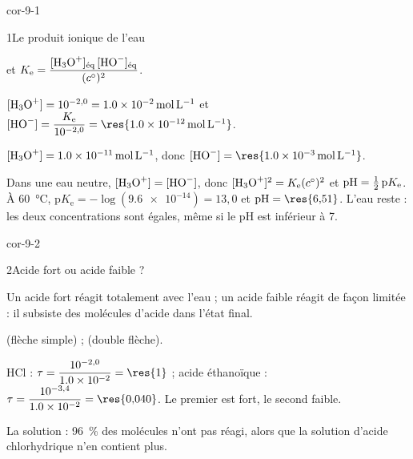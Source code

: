 \corrigesSouples

\begin{blocLivre}{cor-9-1}
\begin{corrige}{1}{Le produit ionique de l'eau}
\begin{questions}
\item {} et $K_\mathrm{e}=\dfrac{[\ce{H3O+}]_\text{éq}\,[\ce{HO-}]_\text{éq}}{(\cst)^2}$.
\item $[\ce{H3O+}]=10^{-2{,}0}=\qty{1,0e-2}{mol.L^{-1}}$ et $[\ce{HO-}]=\dfrac{K_\mathrm{e}}{10^{-2{,}0}}=\res{\qty{1,0e-12}{mol.L^{-1}}}$.
\item $[\ce{H3O+}]=\qty{1,0e-11}{mol.L^{-1}}$, donc $[\ce{HO-}]=\res{\qty{1,0e-3}{mol.L^{-1}}}$.
\item Dans une eau neutre, $[\ce{H3O+}]=[\ce{HO-}]$, donc $[\ce{H3O+}]^2=K_\mathrm{e}(\cst)^2$ et
$\mathrm{pH}=\frac12\,\mathrm{p}K_\mathrm{e}$. À 60~°C, $\mathrm{p}K_\mathrm{e}=-\log(\num{9.6e-14})=13{,}0$ et $\pH=\res{6{,}51}$.
L'eau reste  : les deux concentrations sont égales, même si le pH est inférieur à 7.
\end{questions}
\end{corrige}
\end{blocLivre}
\begin{blocLivre}{cor-9-2}
\begin{corrige}{2}{Acide fort ou acide faible ?}
\begin{questions}
\item Un acide fort réagit totalement avec l'eau ; un acide faible réagit de façon limitée : il subsiste des molécules
d'acide dans l'état final.
\item {} (flèche simple) ;  (double flèche).
\item HCl : $\tau=\dfrac{10^{-2{,}0}}{\num{1.0e-2}}=\res{1}$ ; acide éthanoïque :
$\tau=\dfrac{10^{-3{,}4}}{\num{1.0e-2}}=\res{0{,}040}$. Le premier est fort, le second faible.
\item La solution  : 96~\% des molécules n'ont pas réagi, alors que la solution d'acide
chlorhydrique n'en contient plus.
\end{questions}
\end{corrige}
\end{blocLivre}
